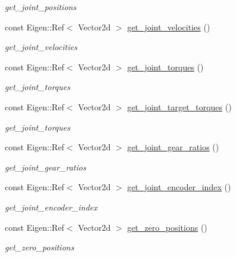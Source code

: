 \begin{DoxyCompactItemize}
\begin{DoxyCompactList}\small\item\em get\+\_\+joint\+\_\+positions \end{DoxyCompactList}\item 
const Eigen\+::\+Ref$<$ Vector2d $>$ \hyperlink{classblmc__robots_1_1SingleLeg_aad4d838300a95db9e5e78aa465601591}{get\+\_\+joint\+\_\+velocities} ()
\begin{DoxyCompactList}\small\item\em get\+\_\+joint\+\_\+velocities \end{DoxyCompactList}\item 
const Eigen\+::\+Ref$<$ Vector2d $>$ \hyperlink{classblmc__robots_1_1SingleLeg_adba890cb19a75df119a94d2f3b063ec2}{get\+\_\+joint\+\_\+torques} ()
\begin{DoxyCompactList}\small\item\em get\+\_\+joint\+\_\+torques \end{DoxyCompactList}\item 
const Eigen\+::\+Ref$<$ Vector2d $>$ \hyperlink{classblmc__robots_1_1SingleLeg_ab28eb09362cee1b0eaa1a066d5f4d760}{get\+\_\+joint\+\_\+target\+\_\+torques} ()
\begin{DoxyCompactList}\small\item\em get\+\_\+joint\+\_\+torques \end{DoxyCompactList}\item 
const Eigen\+::\+Ref$<$ Vector2d $>$ \hyperlink{classblmc__robots_1_1SingleLeg_ac697752c8bd67dc1f58360dbe46e57a6}{get\+\_\+joint\+\_\+gear\+\_\+ratios} ()
\begin{DoxyCompactList}\small\item\em get\+\_\+joint\+\_\+gear\+\_\+ratios \end{DoxyCompactList}\item 
const Eigen\+::\+Ref$<$ Vector2d $>$ \hyperlink{classblmc__robots_1_1SingleLeg_a3048925f67d4585e45200e6de05b73ac}{get\+\_\+joint\+\_\+encoder\+\_\+index} ()
\begin{DoxyCompactList}\small\item\em get\+\_\+joint\+\_\+encoder\+\_\+index \end{DoxyCompactList}\item 
const Eigen\+::\+Ref$<$ Vector2d $>$ \hyperlink{classblmc__robots_1_1SingleLeg_a010c3169b55ae8bab809efaa986987a3}{get\+\_\+zero\+\_\+positions} ()
\begin{DoxyCompactList}\small\item\em get\+\_\+zero\+\_\+positions \end{DoxyCompactList}\item 

\end{DoxyCompactItemize}
